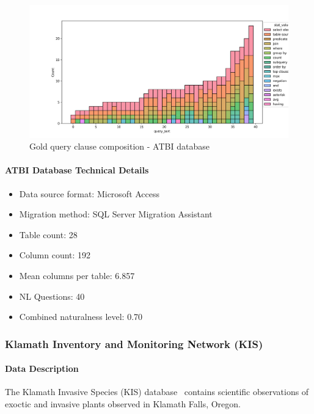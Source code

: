 \begin{figure}[H]
  \centering
  \includegraphics[width=\linewidth]{figures/query-stats/ATBI-stats-clause-counts.png}
  \caption{Gold query clause composition - ATBI database}
  \label{fig:query-complexity-atbi}
\end{figure}

\paragraph{ATBI Database Technical Details}
\begin{itemize}
  \item Data source format: Microsoft Access
  \item Migration method: SQL Server Migration Assistant
  \item Table count: 28
  \item Column count: 192
  \item Mean columns per table: 6.857
  \item NL Questions: 40
  \item Combined naturalness level: 0.70 
\end{itemize}

\subsubsection{Klamath Inventory and Monitoring Network (KIS)}

\paragraph{Data Description}
The Klamath Invasive Species (KIS) database~\cite{klamath-inventory} contains scientific observations of exoctic and invasive plants observed in Klamath Falls, Oregon.

